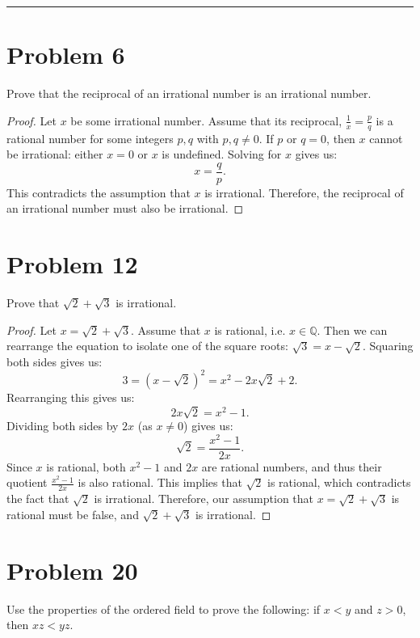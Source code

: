\documentclass[12pt]{article}
\author{Kiran Jones \\
  \texttt{kiran.p.jones.27@dartmouth.edu}}
\date{Due: July 2, 2025}
\begin{document}
  \maketitle
  \thispagestyle{empty}
  \noindent
  \rule{\linewidth}{0.4pt}
  \newpage
  
  
  \section*{Problem 6}
  \setcounter{page}{1}
  Prove that the reciprocal of an irrational number is an irrational number.

  \begin{proof}
    Let $x$ be some irrational number. Assume that its reciprocal, $\frac{1}{x} = \frac{p}{q}$ is a rational number for some integers $p, q$ with $p, q \neq 0$. If $p$ or $q = 0$, then $x$ cannot be irrational: either $x = 0$ or $x$ is undefined. Solving for $x$ gives us:
    \[
      x = \frac{q}{p}.
    \]
    This contradicts the assumption that $x$ is irrational. Therefore, the reciprocal of an irrational number must also be irrational.
  \end{proof}
  \newpage


  \section*{Problem 12}
  Prove that $\sqrt{2} + \sqrt{3}$ is irrational.

  \begin{proof}
    Let $x = \sqrt{2} + \sqrt{3}$. Assume that $x$ is rational, i.e. $x \in \mathbb{Q}$. Then we can rearrange the equation to isolate one of the square roots: $\sqrt{3} = x - \sqrt{2}$.
    Squaring both sides gives us:
    \[
      3 = (x - \sqrt{2})^2 = x^2 - 2x\sqrt{2} + 2.
    \]
    Rearranging this gives us:
    \[
      2x\sqrt{2} = x^2 - 1.
    \]
    Dividing both sides by $2x$ (as $x \neq 0$) gives us:
    \[
      \sqrt{2} = \frac{x^2 - 1}{2x}.
    \]
    Since $x$ is rational, both $x^2 - 1$ and $2x$ are rational numbers, and thus their quotient $\frac{x^2 - 1}{2x}$ is also rational. This implies that $\sqrt{2}$ is rational, which contradicts the fact that $\sqrt{2}$ is irrational. Therefore, our assumption that $x = \sqrt{2} + \sqrt{3}$ is rational must be false, and $\sqrt{2} + \sqrt{3}$ is irrational.
  \end{proof}
  \newpage


  \section*{Problem 20}
  Use the properties of the ordered field to prove the following: if $x < y$ and $z > 0$, then $xz < yz$.
\end{document}
